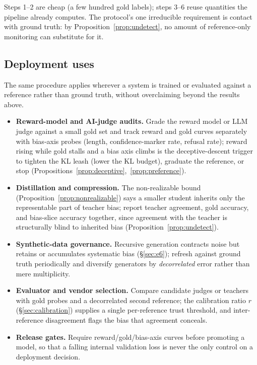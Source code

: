 \documentclass[10pt]{article} %
\theoremstyle{plain}
\theoremstyle{remark}
\begin{document}
\noindent Steps 1--2 are cheap (a few hundred gold labels); steps 3--6 reuse quantities the pipeline already computes. The protocol's one irreducible requirement is contact with ground truth: by Proposition~\ref{prop:undetect}, no amount of reference-only monitoring can substitute for it.

\subsection{Deployment uses}
\label{sec:deployment}
The same procedure applies wherever a system is trained or evaluated against a reference rather than ground truth, without overclaiming beyond the results above.
\begin{itemize}[leftmargin=1.4em,itemsep=2pt,topsep=2pt]
\item \textbf{Reward-model and AI-judge audits.} Grade the reward model or LLM judge against a small gold set and track reward and gold curves separately with bias-axis probes (length, confidence-marker rate, refusal rate); reward rising while gold stalls and a bias axis climbs is the deceptive-descent trigger to tighten the KL leash (lower the KL budget), graduate the reference, or stop (Propositions~\ref{prop:deceptive},~\ref{prop:preference}).
\item \textbf{Distillation and compression.} The non-realizable bound (Proposition~\ref{prop:nonrealizable}) says a smaller student inherits only the representable part of teacher bias; report teacher agreement, gold accuracy, and bias-slice accuracy together, since agreement with the teacher is structurally blind to inherited bias (Proposition~\ref{prop:undetect}).
\item \textbf{Synthetic-data governance.} Recursive generation contracts noise but retains or accumulates systematic bias (\S\ref{sec:e6}); refresh against ground truth periodically and diversify generators by \emph{decorrelated} error rather than mere multiplicity.
\item \textbf{Evaluator and vendor selection.} Compare candidate judges or teachers with gold probes and a decorrelated second reference; the calibration ratio $r$ (\S\ref{sec:calibration}) supplies a single per-reference trust threshold, and inter-reference disagreement flags the bias that agreement conceals.
\item \textbf{Release gates.} Require reward/gold/bias-axis curves before promoting a model, so that a falling internal validation loss is never the only control on a deployment decision.
\end{itemize}
\end{document}

